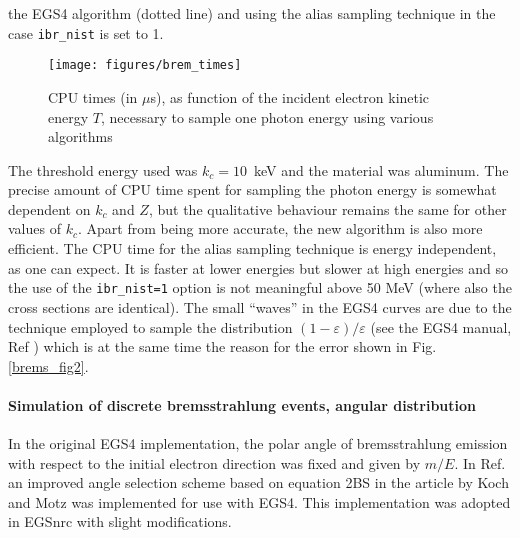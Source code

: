the EGS4 algorithm (dotted line) and using the alias sampling technique
in the case {\tt ibr\_nist} is set to 1.
\begin{figure}[htp]
\texttt{[image: figures/brem\_times]}
\caption[CPU times for bremsstrahlung sampling]{\label{brems_times}
CPU times (in $\mu$s), as function of the incident electron kinetic
energy $T$, necessary to sample one photon energy using various
algorithms}
\end{figure}
The threshold energy used was $k_c = 10$~keV and the material
was aluminum. The precise
amount of CPU time spent for sampling the photon energy
is somewhat dependent on $k_c$ and $Z$, but the qualitative
behaviour remains the same for other values of $k_c$.
Apart from being more accurate, the new algorithm is also more
efficient. The CPU time for the alias sampling technique is
energy independent, as one can expect. It is faster at lower
energies but slower at high energies and so the use
of the {\tt ibr\_nist=1} option is not meaningful above 50 MeV
(where also the cross sections are identical). The small
``waves'' in the EGS4 curves are due to the technique employed
to sample the distribution $(1-\varepsilon)/\varepsilon$
(see the EGS4 manual, Ref \cite{Ne85}) which is at the same time
the reason for the error shown in Fig. \ref{brems_fig2}.

\paragraph{Simulation of discrete bremsstrahlung events,
angular distribution}
\hfill
{}

In the original EGS4 implementation, the polar angle of bremsstrahlung
emission with respect to the initial electron direction was fixed
and given by $m/E$. In Ref. \cite{Bi89} an improved angle selection
scheme based on equation 2BS in the article by Koch and Motz \cite{KM59}
was implemented for use with EGS4. This implementation
was adopted in EGSnrc with slight modifications.

